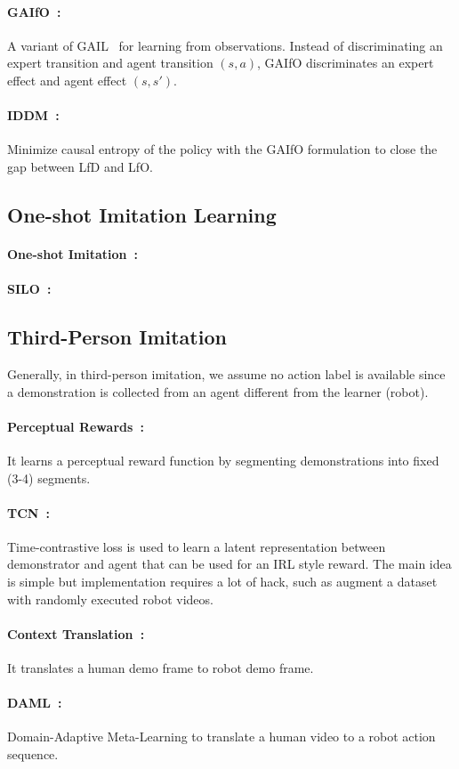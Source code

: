 \paragraph{GAIfO~\citep{torabi2018generative}:}
A variant of GAIL~\citep{ho2016generative} for learning from observations. Instead of discriminating an expert transition and agent transition $(s, a)$, GAIfO discriminates an expert effect and agent effect $(s, s')$.

\paragraph{IDDM~\citep{yang2019imitation}:} 
Minimize causal entropy of the policy with the GAIfO formulation to close the gap between LfD and LfO.


\subsection{One-shot Imitation Learning}

\paragraph{One-shot Imitation~\citep{duan2017one-shot,finn2017one-shot}:}


\paragraph{SILO~\citep{lee2019silo}:}


\subsection{Third-Person Imitation}
Generally, in third-person imitation, we assume no action label is available since a demonstration is collected from an agent different from the learner (robot).

\paragraph{Perceptual Rewards~\citep{sermanet2017rewards}:}
It learns a perceptual reward function by segmenting demonstrations into fixed (3-4) segments.

\paragraph{TCN~\citep{sermanet2018time}:}
Time-contrastive loss is used to learn a latent representation between demonstrator and agent that can be used for an IRL style reward. The main idea is simple but implementation requires a lot of hack, such as augment a dataset with randomly executed robot videos.

\paragraph{Context Translation~\citep{liu2018imitation}:}
It translates a human demo frame to robot demo frame.

\paragraph{DAML~\citep{yu2018aone,yu2018bone}:}
Domain-Adaptive Meta-Learning to translate a human video to a robot action sequence.